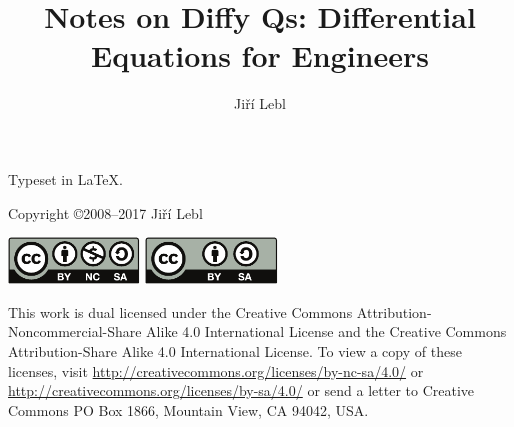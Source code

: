 \documentclass[12pt]{book}
\author{Ji\v{r}\'i Lebl}
\title{Notes on Diffy Qs: Differential Equations for Engineers}
\begin{document}


\newcommand{\theversion}{5.2}
\makediffytitlepage

\pagebreak

\vspace*{\fill}

\noindent
Typeset in \LaTeX.

\bigskip

\noindent
Copyright \copyright 2008--2017 Ji\v{r}\'i Lebl


\bigskip

\noindent
\includegraphics[width=1.38in]{figures/license}
\quad
\includegraphics[width=1.38in]{figures/license2}

\bigskip

\noindent
This work is dual licensed under
the Creative Commons
Attribution-Non\-commercial-Share Alike 4.0 International License and
the Creative Commons
Attribution-Share Alike 4.0 International License.
To view a
copy of these licenses, visit
\url{http://creativecommons.org/licenses/by-nc-sa/4.0/}
or
\url{http://creativecommons.org/licenses/by-sa/4.0/}
or send a letter to
Creative Commons
PO Box 1866, Mountain View, CA 94042, USA.
\end{document}
